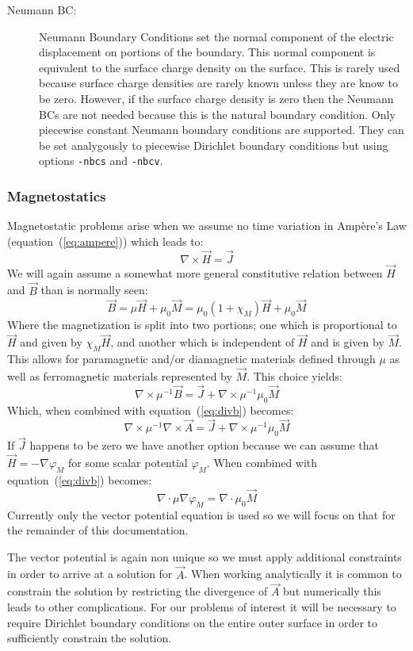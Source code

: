 \documentclass{article}
\newcommand{\refEq}[1]{(\ref{eq:#1})}
\newcommand{\Div}{\nabla\!\cdot\!}
\newcommand{\Curl}{\nabla\!\times\!}
\newcommand{\Grad}{\nabla\!}
\begin{document}
\begin{description}
\item[Neumann BC:] Neumann Boundary Conditions set the normal
  component of the electric displacement on portions of the boundary.
  This normal component is equivalent to the surface charge density on
  the surface.  This is rarely used because surface charge densities
  are rarely known unless they are know to be zero.  However, if the
  surface charge density is zero then the Neumann BCs are not needed
  because this is the natural boundary condition.  Only piecewise
  constant Neumann boundary conditions are supported.  They can be set
  analygously to piecewise Dirichlet boundary conditions but using
  options {\tt -nbcs} and {\tt -nbcv}.

\end{description}


\subsubsection{Magnetostatics}

Magnetostatic problems arise when we assume no time variation in
Amp\`ere's Law (equation~\refEq{ampere}) which leads to:
\[\Curl\vec{H}=\vec{J}\]
We will again assume a somewhat more general constitutive
relation between $\vec{H}$ and $\vec{B}$ than is normally seen:
\[\vec{B}=\mu\vec{H}+\mu_0\vec{M} = \mu_0\left(1+\chi_M\right)\vec{H}+\mu_0\vec{M}\]
Where the magnetization is split into two portions; one which is
proportional to $\vec{H}$ and given by $\chi_M\vec{H}$, and another
which is independent of $\vec{H}$ and is given by $\vec{M}$.  This
allows for paramagnetic and/or diamagnetic materials defined through
$\mu$ as well as ferromagnetic materials represented by $\vec{M}$.
This choice yields:
\[\Curl\mu^{-1}\vec{B}=\vec{J}+\Curl\mu^{-1}\mu_0\vec{M}\]
Which, when combined with equation~\refEq{divb} becomes:
\begin{equation}
\Curl\mu^{-1}\Curl\vec{A}=\vec{J}+\Curl\mu^{-1}\mu_0\vec{M}
\end{equation}
If $\vec{J}$ happens to be zero we have another option because we can
assume that $\vec{H} = -\Grad\varphi_M$ for some scalar potential
$\varphi_M$.  When combined with equation~\refEq{divb} becomes:
\begin{equation}
\Div\mu\Grad\varphi_M = \Div\mu_0\vec{M}
\end{equation}
Currently only the vector potential equation is used so we will focus
on that for the remainder of this documentation.

The vector potential is again non unique so we must apply additional
constraints in order to arrive at a solution for $\vec{A}$.  When
working analytically it is common to constrain the solution by
restricting the divergence of $\vec{A}$ but numerically this leads to
other complications.  For our problems of interest it will be
necessary to require Dirichlet boundary conditions on the entire outer
surface in order to sufficiently constrain the solution.
\end{document}
